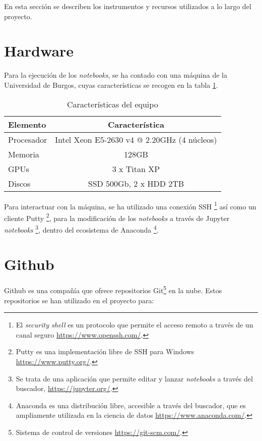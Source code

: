  \label{capitulo4}

En esta sección se describen los instrumentos y recursos utilizados a lo largo del proyecto. 

\section{Hardware} \label{Hardware}

Para la ejecución de los \textit{notebooks}, se ha contado con una máquina de la Universidad de Burgos, cuyas características se recogen en la tabla \ref{caracteristicaspc}.

\begin{table}[h!]
\begin{tabular}{l c}
Elemento & Característica \\
\hline
Procesador & Intel Xeon E5-2630 v4 @ 2.20GHz (4 núcleos)\\
Memoria & 128GB\\
GPUs & 3 x Titan XP\\
Discos & SSD 500Gb, 2 x HDD 2TB\\
\end{tabular}
\caption{\label{caracteristicaspc} Características del equipo}
\end{table}

Para interactuar con la máquina, se ha utilizado una conexión SSH \footnote{El \textit{security shell} es un protocolo que permite el acceso remoto a través de un canal seguro \url{https://www.openssh.com/}.} así como un cliente Putty \footnote{Putty es una implementación libre de SSH para Windows \url{https://www.putty.org/}.}, para la modificación de los \textit{notebooks} a través de Jupyter \textit{notebooks} \footnote{Se trata de una aplicación que permite editar y lanzar \textit{notebooks} a través del buscador, \url{https://jupyter.org/}.}, dentro del ecosistema de Anaconda \footnote{Anaconda es una distribución libre, accesible a través del buscador, que es ampliamente utilizada en la ciencia de datos \url{https://www.anaconda.com/}.}.

\section{Github}

Github es una compañía que ofrece repositorios Git\footnote{Sistema de control de versiones \url{https://git-scm.com/}.} en la nube. 
Estos repositorios se han utilizado en el proyecto para:


